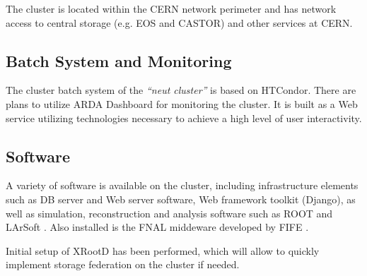 \documentclass[pdftex,12pt,letter]{article}
\begin{document}
The cluster is located within the CERN network perimeter and has network access to central
storage (e.g. EOS and CASTOR) and other  services at CERN.

\subsection{Batch System and Monitoring}
The cluster batch system of the \textit{``neut cluster''} is based on HTCondor\cite{htcondor}.
There are plans to utilize ARDA \cite{arda} Dashboard for monitoring the cluster.
 It is built as a Web service utilizing technologies necessary to achieve a high level of user interactivity.

\subsection{Software}
A variety of software is available on the cluster, including infrastructure elements such as DB server and
Web server software, Web framework toolkit (Django), as well as simulation, reconstruction and analysis
software such as ROOT \cite{root} and LArSoft \cite{larsoft}. Also installed is the FNAL middeware developed by FIFE
\cite{fife}.

Initial setup of XRootD\cite{xrootd} has been performed, which will allow to quickly implement storage federation
on the cluster if needed.
\end{document}
